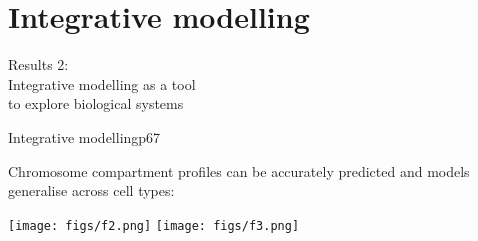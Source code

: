 \documentclass{beamer}
\begin{document}

\section{Integrative modelling}

{
\begin{frame}{}
\begin{tcolorbox}[colback=blue!40!black,colframe=blue!40!black]
\begin{center}
{
{\small Results 2: } \\
 Integrative modelling as a tool \\ to explore biological systems}
\end{center}
\end{tcolorbox}
\end{frame}
}


\begin{frame}{Integrative modelling}{p67}

Chromosome compartment profiles can be accurately predicted and models generalise across cell types: \\

\vspace{2em}

\centering
\texttt{[image: figs/f2.png]}
\texttt{[image: figs/f3.png]}

\end{frame}
\end{document}
